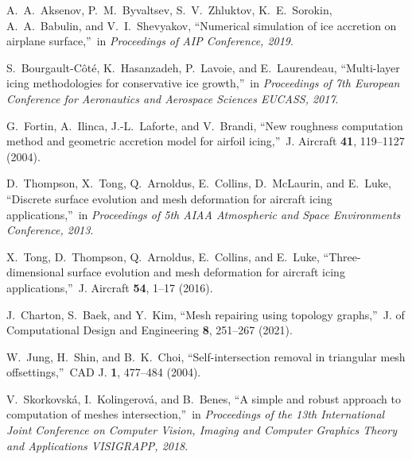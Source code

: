 \documentclass[
11pt,%
tightenlines,%
twoside,%
onecolumn,%
nofloats,%
nobibnotes,%
nofootinbib,%
superscriptaddress,%
noshowpacs,%
centertags]%
{revtex4}
\begin{document}
\begin{thebibliography}{99}
A.~A.~Aksenov, P.~M.~Byvaltsev, S.~V.~Zhluktov, K.~E.~Sorokin, A.~A.~Babulin, and V.~I.~Shevyakov, \textquotedblleft Numerical simulation of ice accretion on airplane surface,\textquotedblright \ in \textit{Proceedings of AIP Conference, 2019}.


S.~Bourgault-C\^ot\'e, K.~Hasanzadeh, P.~Lavoie, and E.~Laurendeau, \textquotedblleft Multi-layer icing methodologies for conservative ice growth,\textquotedblright \ in \textit{Proceedings of 7th European Conference for Aeronautics and Aerospace Sciences EUCASS, 2017}.

G.~Fortin, A.~Ilinca, J.-L.~Laforte, and V.~Brandi, \textquotedblleft New roughness computation method and geometric accretion model for airfoil icing,\textquotedblright \ J. Aircraft \textbf{41}, 119--1127 (2004).

D.~Thompson, X.~Tong, Q.~Arnoldus, E.~Collins, D.~McLaurin, and E.~Luke, \textquotedblleft Discrete surface evolution and mesh deformation for aircraft icing applications,\textquotedblright \ in \textit{Proceedings of 5th AIAA Atmospheric and Space Environments Conference, 2013}.

X.~Tong, D.~Thompson, Q.~Arnoldus, E.~Collins, and E.~Luke, \textquotedblleft Three-dimensional surface evolution and mesh deformation for aircraft icing applications,\textquotedblright \ J. Aircraft \textbf{54}, 1--17 (2016).


J.~Charton, S.~Baek, and Y.~Kim, \textquotedblleft Mesh repairing using topology graphs,\textquotedblright \ J. of Computational Design and Engineering \textbf{8}, 251--267 (2021).

W.~Jung, H.~Shin, and B.~K.~Choi, \textquotedblleft Self-intersection removal in triangular mesh offsettings,\textquotedblright \ CAD J. \textbf{1}, 477--484 (2004).

V.~Skorkovsk\'a, I.~Kolingerov\'a, and B.~Benes, \textquotedblleft A simple and robust approach to computation of meshes intersection,\textquotedblright \ in \textit{Proceedings of the 13th International Joint Conference on Computer Vision, Imaging and Computer Graphics Theory and Applications VISIGRAPP, 2018}.

\end{thebibliography}
\end{document}
